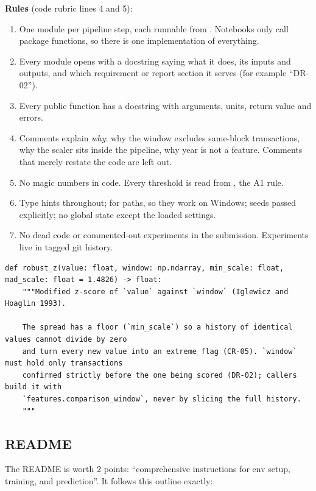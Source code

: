 \textbf{Rules} (code rubric lines 4 and 5):
\begin{enumerate}
  \item One module per pipeline step, each runnable from . Notebooks only call
    package functions, so there is one implementation of everything.
  \item Every module opens with a docstring saying what it does, its inputs and outputs, and which
    requirement or report section it serves (for example ``DR-02'').
  \item Every public function has a docstring with arguments, units, return value and errors.
  \item Comments explain \emph{why}: why the window excludes same-block transactions, why the
    scaler sits inside the pipeline, why year is not a feature. Comments that merely restate the
    code are left out.
  \item No magic numbers in code. Every threshold is read from , the A1 rule.
  \item Type hints throughout;  for paths, so they work on Windows; seeds passed
    explicitly; no global state except the loaded settings.
  \item No dead code or commented-out experiments in the submission. Experiments live in tagged
    git history.
\end{enumerate}

\begin{lstlisting}[style=py]
def robust_z(value: float, window: np.ndarray, min_scale: float, mad_scale: float = 1.4826) -> float:
    """Modified z-score of `value` against `window` (Iglewicz and Hoaglin 1993).

    The spread has a floor (`min_scale`) so a history of identical values cannot divide by zero
    and turn every new value into an extreme flag (CR-05). `window` must hold only transactions
    confirmed strictly before the one being scored (DR-02); callers build it with
    `features.comparison_window`, never by slicing the full history.
    """
\end{lstlisting}

\subsection{README}
\label{sec:readme}

The README is worth 2 points: ``comprehensive instructions for env setup, training, and
prediction''. It follows this outline exactly:

